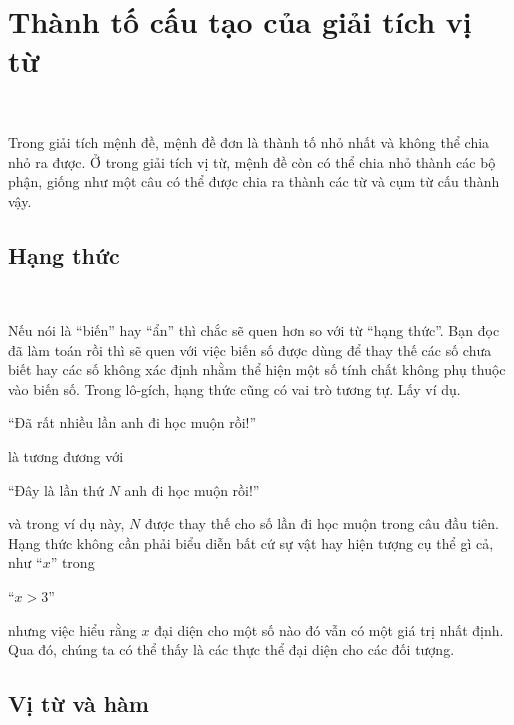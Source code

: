 \section{Thành tố cấu tạo của giải tích vị từ}

\ %

Trong giải tích mệnh đề, mệnh đề đơn là thành tố nhỏ nhất và không thể chia nhỏ ra được. Ở trong giải tích vị từ, mệnh đề còn có thể chia nhỏ thành các bộ phận, giống như một câu có thể được chia ra thành các từ và cụm từ cấu thành vậy.

\subsection{Hạng thức}

\ %

Nếu nói là ``biến'' hay ``ẩn'' thì chắc sẽ quen hơn so với từ ``hạng thức''. Bạn đọc đã làm toán rồi thì sẽ quen với việc biến số được dùng để thay thế các số chưa biết hay các số không xác định nhằm thể hiện một số tính chất không phụ thuộc vào biến số. Trong lô-gích, hạng thức cũng có vai trò tương tự. Lấy ví dụ.
\begin{center}
    ``Đã rất nhiều lần anh đi học muộn rồi!''
\end{center}
là tương đương với
\begin{center}
    ``Đây là lần thứ $N$ anh đi học muộn rồi!''
\end{center}
và trong ví dụ này, $N$ được thay thế cho số lần đi học muộn trong câu đầu tiên. Hạng thức không cần phải biểu diễn bất cứ sự vật hay hiện tượng cụ thể gì cả, như ``$x$'' trong
\begin{center}
    ``$x > 3$''
\end{center}
nhưng việc hiểu rằng $x$ đại diện cho một số nào đó vẫn có một giá trị nhất định. Qua đó, chúng ta có thể thấy  là các thực thể đại diện cho các đối tượng.

\subsection{Vị từ và hàm}

\ %

